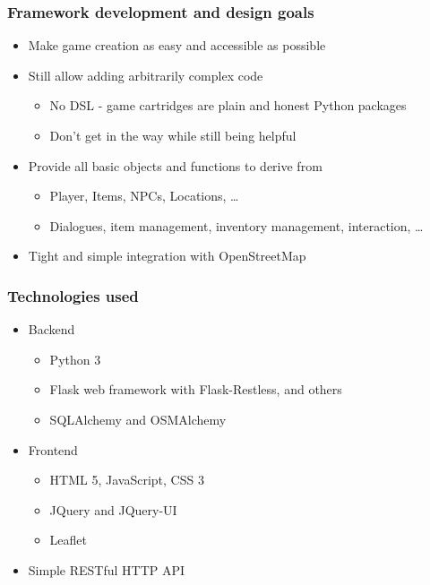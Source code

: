 \documentclass[aspectratio=43]{beamer}
\begin{document}
{ \begin{frame}
  \frametitle{Framework development and design goals}

  \begin{itemize}
   \item{Make game creation as easy and accessible as possible}
   \item{Still allow adding arbitrarily complex code
    \begin{itemize}
     \item{No DSL - game cartridges are plain and honest Python packages}
     \item{Don't get in the way while still being helpful}
    \end{itemize}
   }
   \item{Provide all basic objects and functions to derive from
    \begin{itemize}
     \item{Player, Items, NPCs, Locations, …}
     \item{Dialogues, item management, inventory management, interaction, …}
    \end{itemize}
   }
   \item{Tight and simple integration with OpenStreetMap}
  \end{itemize}
 \end{frame}


 \begin{frame}
  \frametitle{Technologies used}

  \begin{itemize}
   \item{Backend
    \begin{itemize}
     \item{Python 3}
     \item{Flask web framework with Flask-Restless, and others}
     \item{SQLAlchemy and OSMAlchemy}
    \end{itemize}
   }
   \item{Frontend
    \begin{itemize}
     \item{HTML 5, JavaScript, CSS 3}
     \item{JQuery and JQuery-UI}
     \item{Leaflet}
    \end{itemize}
   }
   \item{Simple RESTful HTTP API}
  \end{itemize}
 \end{frame}

}
\end{document}
